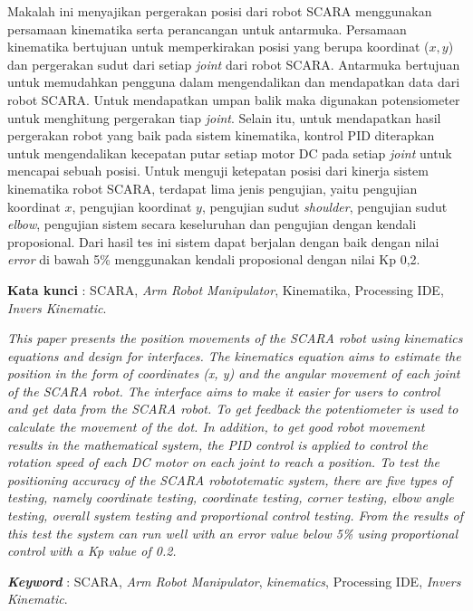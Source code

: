 \documentclass{DTEDI_KP}
\begin{document}
\tableofcontents
{}
\listoftables
{}
\listoffigures
{}

\begin{abstractind}
Makalah ini menyajikan pergerakan posisi dari robot SCARA menggunakan persamaan kinematika serta perancangan untuk antarmuka.  Persamaan kinematika bertujuan untuk memperkirakan posisi yang berupa koordinat ($x,y$) dan pergerakan sudut dari setiap \textit{joint} dari robot SCARA. Antarmuka bertujuan untuk memudahkan pengguna dalam mengendalikan dan mendapatkan data dari robot SCARA. Untuk mendapatkan umpan balik maka digunakan potensiometer untuk menghitung pergerakan tiap \textit{joint}.  Selain itu, untuk mendapatkan hasil pergerakan robot yang baik pada sistem kinematika, kontrol PID diterapkan untuk mengendalikan kecepatan putar setiap motor DC pada setiap \textit{joint} untuk mencapai sebuah posisi. Untuk menguji ketepatan posisi dari kinerja sistem kinematika robot SCARA, terdapat lima jenis pengujian, yaitu pengujian koordinat $x$, pengujian koordinat $y$, pengujian sudut \textit{shoulder}, pengujian sudut \textit{elbow}, pengujian sistem secara keseluruhan dan pengujian dengan kendali proposional. Dari hasil tes ini sistem dapat berjalan dengan baik dengan nilai \textit{error} di bawah 5\% menggunakan kendali proposional dengan nilai Kp 0,2.


\textbf{Kata kunci }: SCARA, \textit{Arm Robot Manipulator}, Kinematika, Processing IDE, \textit{Invers Kinematic}.
\end{abstractind}

\begin{abstracteng}
\textit{This paper presents the position movements of the SCARA robot using kinematics equations and design for interfaces. The kinematics equation aims to estimate the position in the form of coordinates (x, y) and the angular movement of each joint of the SCARA robot. The interface aims to make it easier for users to control and get data from the SCARA robot. To get feedback the potentiometer is used to calculate the movement of the dot. In addition, to get good robot movement results in the mathematical system, the PID control is applied to control the rotation speed of each DC motor on each joint to reach a position. To test the positioning accuracy of the SCARA robototematic system, there are five types of testing, namely coordinate testing, coordinate testing, corner testing, elbow angle testing, overall system testing and proportional control testing. From the results of this test the system can run well with an error value below 5\% using proportional control with a Kp value of 0.2.}


\textit{\textbf{Keyword}} : SCARA, \textit{Arm Robot Manipulator}, \textit{kinematics}, Processing IDE, \textit{Invers Kinematic}.
\end{abstracteng}

\newpage
\setcounter{page}{1}








\end{document}
